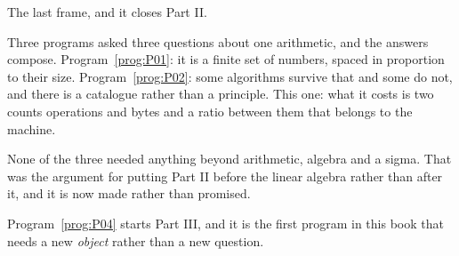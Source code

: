 \begin{fr}
The last frame, and it closes Part II.

Three programs asked three questions about one arithmetic, and the answers
compose. Program~\ref{prog:P01}: it is a finite set of numbers, spaced in
proportion to their size. Program~\ref{prog:P02}: some algorithms survive that
and some do not, and there is a catalogue rather than a principle. This one:
what it costs is two counts \dash{} operations and bytes \dash{} and a ratio
between them that belongs to the machine.

None of the three needed anything beyond arithmetic, algebra and a sigma. That
was the argument for putting Part II before the linear algebra rather than
after it, and it is now made rather than promised.

Program~\ref{prog:P04} starts Part III, and it is the first program in this
book that needs a new \emph{object} rather than a new question.
\end{fr}

